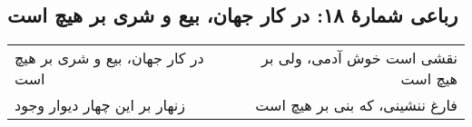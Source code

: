 \begin{center}
\section*{رباعی شمارهٔ ۱۸: در کار جهان، بیع و شری بر هیچ است}
\label{sec:018}
\begin{longtable}{l p{0.5cm} r}
در کار جهان، بیع و شری بر هیچ است
&&
نقشی است خوش آدمی، ولی بر هیچ است
\\
زنهار بر این چهار دیوار وجود
&&
فارغ ننشینی، که بنی بر هیچ است
\\
\end{longtable}
\end{center}
